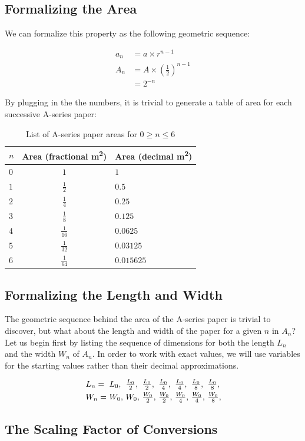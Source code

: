 \subsection*{Formalizing the Area}
We can formalize this property as the following geometric sequence:

\begin{align*}
  a_{n} &= a \times r^{n - 1} \\
  A_{n} &= A \times \left(\frac{1}{2}\right)^{n -1} \\
        &= 2^{-n}
\end{align*}

\noindent
By plugging in the the numbers, it is trivial to generate a table of area for each successive A-series paper:

\begin{table}[h]
  \centering\makegapedcells
    \begin{tabular}{@{}lcl@{}}
    \toprule
    $n$ & Area (fractional \si{\meter\squared}) & Area (decimal \si{\meter\squared}) \\ \midrule
    $0$ & $1$               & $1$              \\
    $1$ & $\frac{1}{2}$     & $0.5$            \\
    $2$ & $\frac{1}{4}$     & $0.25$           \\
    $3$ & $\frac{1}{8}$     & $0.125$          \\
    $4$ & $\frac{1}{16}$    & $0.0625$         \\
    $5$ & $\frac{1}{32}$    & $0.03125$        \\
    $6$ & $\frac{1}{64}$    & $0.015625$       \\ \bottomrule
  \end{tabular}
  \caption{List of A-series paper areas for $0 \geq n \leq 6$}
  \label{tab:area}
\end{table}

\subsection*{Formalizing the Length and Width}
The geometric sequence behind the area of the A-series paper is trivial to discover, but what about the length and width of the paper for a given $n$ in $A_{n}$? Let us begin first by listing the sequence of dimensions for both the length $L_{n}$ and the width $W_{n}$ of $A_{n}$. In order to work with exact values, we will use variables for the starting values rather than their decimal approximations.

\[
  \begin{array}{*{8}{l@{\ }}}
    L_{n} = & L_{0}, & \frac{L_0}{2}, & \frac{L_{0}}{2}, & \frac{L_{0}}{4}, & \frac{L_{0}}{4}, & \frac{L_{0}}{8}, & \frac{L_{0}}{8}, \\[\jot]
    W_{n} = & W_{0}, &         W_{0}, & \frac{W_{0}}{2}, & \frac{W_{0}}{2}, & \frac{W_{0}}{4}, & \frac{W_{0}}{4}, & \frac{W_{0}}{8},
  \end{array}
\]

\subsection*{The Scaling Factor of Conversions}
